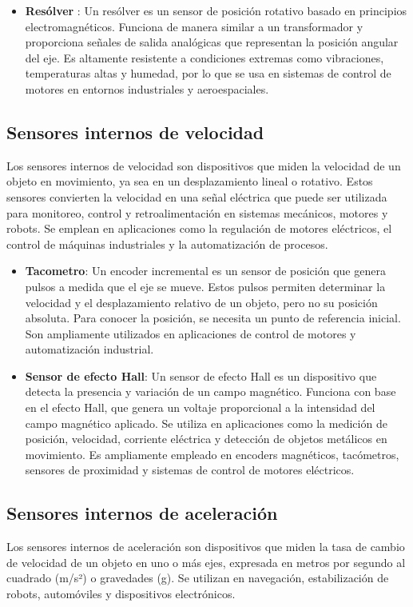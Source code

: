 \begin{itemize}
\item \textbf{Resólver }: Un resólver es un sensor de posición rotativo basado en principios electromagnéticos. Funciona de manera similar a un transformador y proporciona señales de salida analógicas que representan la posición angular del eje. Es altamente resistente a condiciones extremas como vibraciones, temperaturas altas y humedad, por lo que se usa en sistemas de control de motores en entornos industriales y aeroespaciales.

\end{itemize}

\subsection{Sensores internos de velocidad}
Los sensores internos de velocidad son dispositivos que miden la velocidad de un objeto en movimiento, ya sea en un desplazamiento lineal o rotativo. Estos sensores convierten la velocidad en una señal eléctrica que puede ser utilizada para monitoreo, control y retroalimentación en sistemas mecánicos, motores y robots. Se emplean en aplicaciones como la regulación de motores eléctricos, el control de máquinas industriales y la automatización de procesos.


\begin{itemize}
	\item \textbf{Tacometro}: Un encoder incremental es un sensor de posición que genera pulsos a medida que el eje se mueve. Estos pulsos permiten determinar la velocidad y el desplazamiento relativo de un objeto, pero no su posición absoluta. Para conocer la posición, se necesita un punto de referencia inicial. Son ampliamente utilizados en aplicaciones de control de motores y automatización industrial.

	\item \textbf{Sensor de efecto Hall}: Un sensor de efecto Hall es un dispositivo que detecta la presencia y variación de un campo magnético. Funciona con base en el efecto Hall, que genera un voltaje proporcional a la intensidad del campo magnético aplicado. Se utiliza en aplicaciones como la medición de posición, velocidad, corriente eléctrica y detección de objetos metálicos en movimiento. Es ampliamente empleado en encoders magnéticos, tacómetros, sensores de proximidad y sistemas de control de motores eléctricos.

\end{itemize}\newpage
\subsection{Sensores internos de aceleración}
Los sensores internos de aceleración son dispositivos que miden la tasa de cambio de velocidad de un objeto en uno o más ejes, expresada en metros por segundo al cuadrado (m/s²) o gravedades (g). Se utilizan en navegación, estabilización de robots, automóviles y dispositivos electrónicos.


